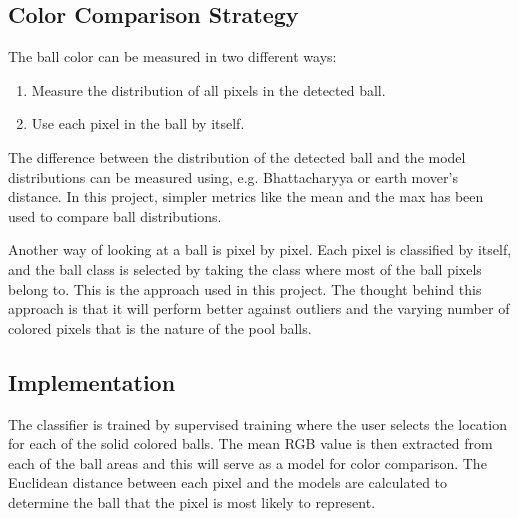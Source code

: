 \subsection{Color Comparison Strategy}

The ball color can be measured in two different ways: 
\begin{enumerate}
  \item Measure the distribution of all pixels in the detected ball.
  \item Use each pixel in the ball by itself.
\end{enumerate}

The difference between the distribution of the detected ball and the model distributions can be measured using, e.g. Bhattacharyya or earth mover's distance. In this project, simpler metrics like the mean and the max has been used to compare ball distributions. 

Another way of looking at a ball is pixel by pixel. Each pixel is classified by itself, and the ball class is selected by taking the class where most of the ball pixels belong to. This is the approach used in this project. The thought behind this approach is that it will perform better against outliers and the varying number of colored pixels that is the nature of the pool balls. 

\subsection{Implementation}
The classifier is trained by supervised training where the user selects the location for each of the solid colored balls. The mean RGB value is then extracted from each of the ball areas and this will serve as a model for color comparison. The Euclidean distance between each pixel and the models are calculated to determine the ball that the pixel is most likely to represent.

